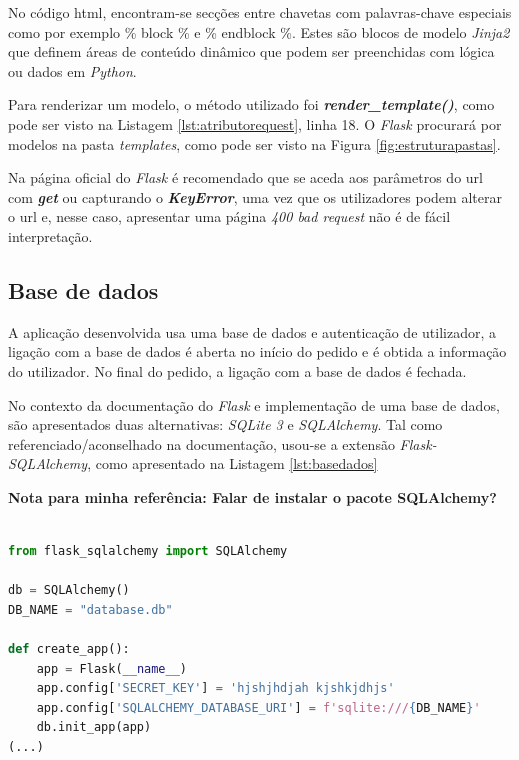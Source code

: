 No código \acrshort{html}, encontram-se secções entre chavetas {} com palavras-chave especiais como por exemplo {\% block \%} e {\% endblock \%}. Estes são blocos de modelo \textit{Jinja2} que definem áreas de conteúdo dinâmico que podem ser preenchidas com lógica ou dados em \textit{Python}.

Para renderizar um modelo, o método utilizado foi \textit{\textbf{render\_template()}}, como pode ser visto na Listagem \ref{lst:atributorequest}, linha 18. O \textit{Flask} procurará por modelos na pasta \textit{templates}, como pode ser visto na Figura \ref{fig:estruturapastas}.

Na página oficial do \textit{Flask} é recomendado que se aceda aos parâmetros do \acrshort{url} com \textit{\textbf{get}} ou capturando o \textit{\textbf{KeyError}}, uma vez que os utilizadores podem alterar o \acrshort{url} e, nesse caso, apresentar uma página \textit{400 bad request} não é de fácil interpretação.

\subsection{Base de dados}
A aplicação desenvolvida usa uma base de dados e autenticação de utilizador, a ligação com a base de dados é aberta no início do pedido e é obtida a informação do utilizador. No final do pedido, a ligação com a base de dados é fechada.

No contexto da documentação do \textit{Flask} e implementação de uma base de dados, são apresentados duas alternativas: \textit{SQLite 3} e \textit{ SQLAlchemy}. Tal como referenciado/aconselhado na documentação, usou-se a extensão \textit{Flask-SQLAlchemy}, como apresentado na Listagem \ref{lst:basedados}

\textbf{Nota para minha referência: Falar de instalar o pacote SQLAlchemy?}

\begin{minipage}{0.9\linewidth}
	\begin{lstlisting}[language=Python, caption=Exemplo uso \textit{ SQLAlchemy} - \textit{\_\_init.py\_\_}, label=lst:basedados]

from flask_sqlalchemy import SQLAlchemy

db = SQLAlchemy()
DB_NAME = "database.db"

def create_app():
    app = Flask(__name__)
    app.config['SECRET_KEY'] = 'hjshjhdjah kjshkjdhjs'
    app.config['SQLALCHEMY_DATABASE_URI'] = f'sqlite:///{DB_NAME}'
    db.init_app(app)
(...)
\end{lstlisting}
\end{minipage}

